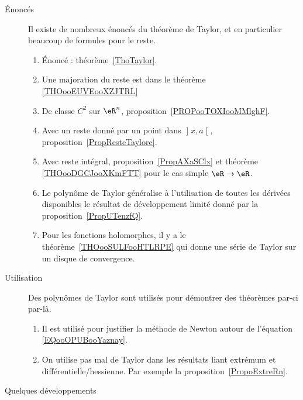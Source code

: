 

\begin{description}
	\item[Énoncés]

	      Il existe de nombreux énoncés du théorème de Taylor, et en particulier beaucoup de formules pour le reste.

	      \begin{enumerate}
		      \item
		            Énoncé : théorème~\ref{ThoTaylor}.
		      \item
		            Une majoration du reste est dans le théorème \ref{THOooEUVEooXZJTRL}
		      \item
		            De classe \( C^2\) sur \( \eR^n\), proposition~\ref{PROPooTOXIooMMlghF}.
		      \item
		            Avec un reste donné par un point dans \( \mathopen] x , a \mathclose[\), proposition~\ref{PropResteTaylorc}.
		      \item
		            Avec reste intégral, proposition~\ref{PropAXaSClx} et théorème \ref{THOooDGCJooXKmFTT} pour le cas simple \( \eR\to \eR\).
		      \item
		            Le polynôme de Taylor généralise à l'utilisation de toutes les dérivées disponibles le résultat de développement limité donné par la proposition~\ref{PropUTenzfQ}.
		      \item
		            Pour les fonctions holomorphes, il y a le théorème~\ref{THOooSULFooHTLRPE} qui donne une série de Taylor sur un disque de convergence.
	      \end{enumerate}

	\item[Utilisation]

	      Des polynômes de Taylor sont utilisés pour démontrer des théorèmes par-ci par-là.

	      \begin{enumerate}
		      \item
		            Il est utilisé pour justifier la méthode de Newton autour de l'équation \eqref{EQooOPUBooYaznay}.
		      \item
		            On utilise pas mal de Taylor dans les résultats liant extrémum et différentielle/hessienne. Par exemple la proposition~\ref{PropoExtreRn}.
	      \end{enumerate}

	\item[Quelques développements]


\end{description}

